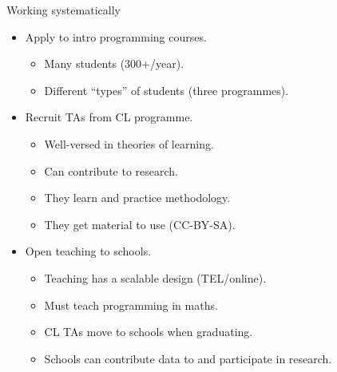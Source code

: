 \begin{frame}
  \begin{block}{Working systematically}
    \begin{itemize}
      \item<+> Apply to intro programming courses.
        \begin{itemize}
          \item Many students (300+/year).
          \item Different \enquote{types} of students (three programmes).
        \end{itemize}
      \item<+> Recruit TAs from CL programme.
        \begin{itemize}
          \item Well-versed in theories of learning.
          \item Can contribute to research.
          \item They learn and practice methodology.
          \item They get material to use (CC-BY-SA).
        \end{itemize}
      \item<+> Open teaching to schools.
        \begin{itemize}
          \item Teaching has a scalable design (TEL/online).
          \item Must teach programming in maths.
          \item CL TAs move to schools when graduating.
          \item Schools can contribute data to and participate in research.
        \end{itemize}
    \end{itemize}
  \end{block}
\end{frame}
